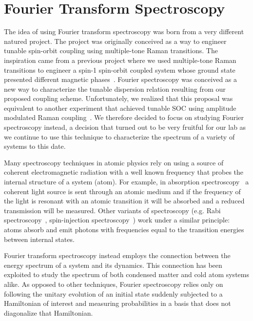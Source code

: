 

\renewcommand{\thechapter}{5}

\chapter{Fourier Transform Spectroscopy}
\label{ch:Fourier_spectroscopy}

The idea of using Fourier transform spectroscopy was born from a very different natured project. The project was originally conceived as a way to engineer tunable spin-orbit coupling using multiple-tone Raman transitions. The inspiration came from a previous project where we used multiple-tone Raman transitions to engineer a spin-1 spin-orbit coupled system whose ground state presented different magnetic phases~\cite{campbell_magnetic_2016}. Fourier spectroscopy was conceived as a new way to characterize the tunable dispersion relation resulting from our proposed coupling scheme. Unfortunately, we realized that this proposal was equivalent to another experiment that achieved tunable SOC using amplitude modulated Raman coupling~\cite{jimenez-garcia_tunable_2015}. We therefore decided to focus on studying Fourier spectroscopy instead, a decision that turned out to be very fruitful for our lab as we continue to use this technique to characterize the spectrum of a variety of systems to this date. 

Many spectroscopy techniques in atomic physics rely on using 
a source of coherent electromagnetic radiation with a well known frequency that probes the internal structure of a system (atom). For example, in absorption spectroscopy~\cite{demtroder_doppler-limited_2008} a coherent light source is sent through an atomic medium and if the frequency of the light is resonant with an atomic transition it will be absorbed and a reduced transmission will be measured. Other variants of spectroscopy (e.g. Rabi spectroscopy~\cite{rabi_space_1937}, spin-injection spectroscopy~\cite{cheuk_spin-injection_2012}) work under a similar principle: atoms absorb and emit photons with frequencies equal to the transition energies between internal states. 

Fourier transform spectroscopy instead employs the connection between the energy spectrum of a system and its dynamics. This connection has been exploited to study the spectrum of both condensed matter \cite{jonas_two-dimensional_2003} and cold atom systems \cite{yoshimura_diabatic-ramping_2014,wang_atom-interferometric_2015} alike.
As opposed to other techniques, Fourier spectroscopy relies only on following the unitary evolution of an initial state suddenly subjected to a Hamiltonian of interest and measuring probabilities in a basis that does not diagonalize that Hamiltonian. 

